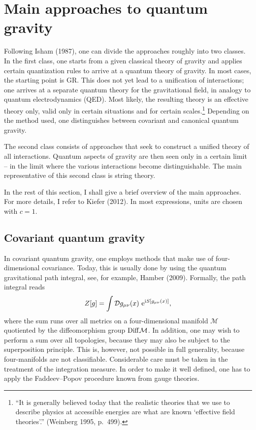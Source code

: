 \documentclass[12pt]{article}
\newcommand{\be}{\begin{equation}}
\newcommand{\ee}{\end{equation}}
\newcommand{\lb}{\label}
\newcommand{\E}{{\rm e}}
\newcommand{\I}{{\rm i}}
\begin{document}

\section{Main approaches to quantum gravity}

Following Isham (1987), one can divide the approaches roughly into two
classes. 
In the first class, one starts from a given classical theory of
gravity and applies certain quantization rules to arrive at a quantum
theory of gravity. In most cases, the starting point is GR. This does
not yet lead to a unification of interactions; one arrives at a
separate quantum theory for the gravitational field, in analogy to
quantum electrodynamics (QED). Most likely, the resulting theory is an
effective theory only, valid only in certain situations and for
certain scales.\footnote{``It is generally believed today that the
  realistic theories that we use to describe physics at accessible
  energies are what are known `effective field theories'.'' (Weinberg
  1995, p.~499).} Depending on the method used, one distinguishes
between covariant and canonical quantum gravity.

The second class consists of approaches that seek to construct a
unified theory of all interactions. Quantum aspects of gravity are
then seen only in a certain limit -- in the limit where the various
interactions become distinguishable. The main representative of this
second class is string theory. 

In the rest of this section, I shall give a brief overview of the main
approaches. For more details, I refer to Kiefer (2012). In most
expressions, units are chosen with $c=1$.


\subsection{Covariant quantum gravity}

In covariant quantum gravity, one employs methods that make use of
four-dimensional covariance. Today, this is usually done by using the
quantum gravitational path integral, see, for example, Hamber (2009). 
Formally, the path integral reads
\be
\lb{pathgrav}
Z[g]=\int{\mathcal D}g_{\mu\nu}(x)\ \E^{\I S[g_{\mu\nu}(x)]},
\ee
where the sum runs over all metrics on a four-dimensional manifold
${\mathcal M}$ quotiented by the diffeomorphism group
${\rm Diff}{\mathcal M}$. 
In addition, one may wish to perform a sum
over all topologies, because they may also be subject to the
superposition principle. This is, however, not possible in full generality,
because four-manifolds are not classifiable. Considerable care must be
taken in the treatment of the integration measure. 
In order to make it well defined, one has to apply
the Faddeev--Popov procedure known from gauge theories. 
\end{document}

